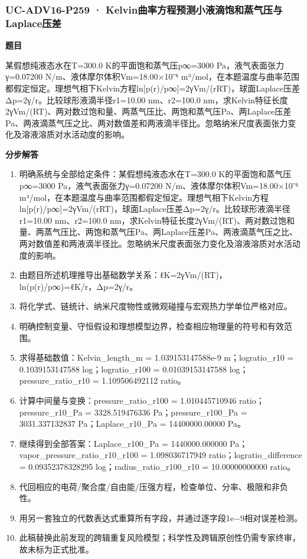 \documentclass[UTF8,11pt,a4paper]{ctexart}
\begin{document}
\subsubsection*{UC-ADV16-P259 · Kelvin曲率方程预测小液滴饱和蒸气压与Laplace压差}
\noindent\textbf{题目}\par
某假想纯液态水在T=300.0 K的平面饱和蒸气压p∞=3000 Pa，液气表面张力γ=0.07200 N/m、液体摩尔体积Vm=18.00×10⁻⁶ m³/mol，在本题温度与曲率范围都假定恒定。理想气相下Kelvin方程ln[p(r)/p∞]=2γVm/(rRT)，球面Laplace压差Δp=2γ/r。比较球形液滴半径r1=10.00 nm、r2=100.0 nm，求Kelvin特征长度2γVm/(RT)、两对数过饱和量、两蒸气压比、两饱和蒸气压Pa、两Laplace压差Pa、两液滴蒸气压之比、两对数值差和两液滴半径比。忽略纳米尺度表面张力变化及溶液溶质对水活动度的影响。\par
\medskip\noindent\textbf{分步解答}
\begin{enumerate}
\item 明确系统与全部给定条件：某假想纯液态水在T=300.0 K的平面饱和蒸气压p∞=3000 Pa，液气表面张力γ=0.07200 N/m、液体摩尔体积Vm=18.00×10⁻⁶ m³/mol，在本题温度与曲率范围都假定恒定。理想气相下Kelvin方程ln[p(r)/p∞]=2γVm/(rRT)，球面Laplace压差Δp=2γ/r。比较球形液滴半径r1=10.00 nm、r2=100.0 nm，求Kelvin特征长度2γVm/(RT)、两对数过饱和量、两蒸气压比、两饱和蒸气压Pa、两Laplace压差Pa、两液滴蒸气压之比、两对数值差和两液滴半径比。忽略纳米尺度表面张力变化及溶液溶质对水活动度的影响。
\item 由题目所述机理推导出基础数学关系：ℓK=2γVm/(RT)，ln(p(r)/p∞)=ℓK/r，Δp=2γ/r。
\item 将化学式、链统计、纳米尺度物性或微观碰撞与宏观热力学单位严格对应。
\item 明确控制变量、守恒假设和理想模型边界，检查相应物理量的符号和有效范围。
\item 求得基础数值：Kelvin\_length\_m = 1.039153147588e-9 m；logratio\_r10 = 0.1039153147588 log；logratio\_r100 = 0.01039153147588 log；pressure\_ratio\_r10 = 1.109506492112 ratio。
\item 计算中间量与变换：pressure\_ratio\_r100 = 1.010445710946 ratio；pressure\_r10\_Pa = 3328.519476336 Pa；pressure\_r100\_Pa = 3031.337132837 Pa；Laplace\_r10\_Pa = 14400000.00000 Pa。
\item 继续得到全部答案：Laplace\_r100\_Pa = 1440000.000000 Pa；vapor\_pressure\_ratio\_r10\_r100 = 1.098036717949 ratio；logratio\_difference = 0.09352378328295 log；radius\_ratio\_r100\_r10 = 10.00000000000 ratio。
\item 代回相应的电荷/聚合度/自由能/压强方程，检查单位、分率、极限和非负性。
\item 用另一套独立的代数表达式重算所有字段，并通过逐字段1e−9相对误差检测。
\item 此稿替换此前发现的跨辑重复风险模型；科学性及跨辑原创性仍需专家终审，故未标为正式批准。
\end{enumerate}
\end{document}
